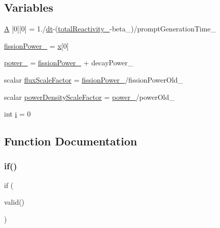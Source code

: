 \subsection*{Variables}
\begin{DoxyCompactItemize}
\item 
\hyperlink{solvePointKinetics_8H_a638ec4f05f04e32dcb695d052d441f80}{A} \mbox{[}0\mbox{]}\mbox{[}0\mbox{]} = 1./\hyperlink{solvePointKineticsLiquidFuel_8H_a5bbfd838dc83547e202d54a2d8578182}{dt}-\/(\hyperlink{correctReactivity_8H_a7bbab844c16aceff17e70128b5c0e13e}{total\+Reactivity\+\_\+}-\/beta\+\_\+)/prompt\+Generation\+Time\+\_\+
\item 
\hyperlink{solvePointKinetics_8H_ae90376858fe578cbd789d06492f68a97}{fission\+Power\+\_\+} = \hyperlink{solvePointKinetics_8H_a7155d56b187a002d8cdd92aa43066620}{x}\mbox{[}0\mbox{]}
\item 
\hyperlink{solvePointKinetics_8H_a6db349ac2f1ddec3951d396b751c02a6}{power\+\_\+} = \hyperlink{solvePointKinetics_8H_ae90376858fe578cbd789d06492f68a97}{fission\+Power\+\_\+} + decay\+Power\+\_\+
\item 
scalar \hyperlink{solvePointKinetics_8H_ae7cb9624687e52092704d22b6384ba21}{flux\+Scale\+Factor} = \hyperlink{solvePointKinetics_8H_ae90376858fe578cbd789d06492f68a97}{fission\+Power\+\_\+}/fission\+Power\+Old\+\_\+
\item 
scalar \hyperlink{solvePointKinetics_8H_ae3d82145363877a2f67d7e1f9d7c5b48}{power\+Density\+Scale\+Factor} = \hyperlink{solvePointKineticsLiquidFuel_8H_a6db349ac2f1ddec3951d396b751c02a6}{power\+\_\+}/power\+Old\+\_\+
\item 
int \hyperlink{solvePointKinetics_8H_acb559820d9ca11295b4500f179ef6392}{i} = 0
\end{DoxyCompactItemize}


\subsection{Function Documentation}
\mbox{\label{solvePointKinetics_8H_a464c37d6b4cbb4baca050af45b49bddc}} 
\subsubsection{\texorpdfstring{if()}{if()}\hspace{0.1cm}{\footnotesize\ttfamily [1/3]}}
{\footnotesize\ttfamily if (\begin{DoxyParamCaption}\item[{decay\+Power\+Ptr\+\_\+.}]{valid() }\end{DoxyParamCaption})}




